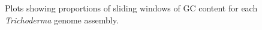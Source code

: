 \begin{figure}
  \begin{center}
  \end{center}
  \caption[GC content distribution for each Trichoderma genome assembly]{Plots showing proportions of sliding windows of GC content
    for each \textit{Trichoderma} genome assembly.}
  \label{fig:assembly-gc}
\end{figure}


